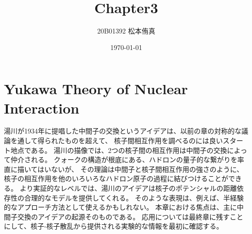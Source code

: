 \documentclass[a4paper,11pt,uplatex]{jsarticle}
\title{Chapter3}
\author{20B01392 松本侑真}
\date{\today}
\begin{document}
\maketitle
\begin{abstract}

\end{abstract}
\tableofcontents
\newpage

\setcounter{section}{5}
\section{Yukawa Theory of Nuclear Interaction}
湯川が1934年に提唱した中間子の交換というアイデアは、以前の章の対称的な議論を通して得られたものを超えて、
核子間相互作用を調べるのには良いスタート地点である。
湯川の描像では、2つの核子間の相互作用は中間子の交換によって仲介される。
クォークの構造が根底にある、ハドロンの量子的な繋がりを率直に描いてはいないが、
その理論は中間子と核子間相互作用の強さのように、核子の相互作用を他のいろいろなハドロン原子の過程に結びつけることができる。
より実証的なレベルでは、湯川のアイデアは核子のポテンシャルの距離依存性の合理的なモデルを提供してくれる。
そのような表現は、例えば、半経験的なアプローチ方法として使えるかもしれない。
本章における焦点は、主に中間子交換のアイデアの起源そのものである。
応用については最終章に残すことにして、核子-核子散乱から提供される実験的な情報を最初に確認する。
\end{document}
